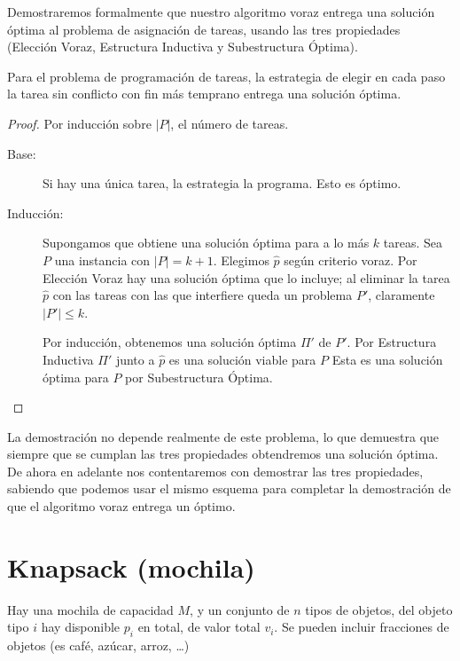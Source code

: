   Demostraremos formalmente que nuestro algoritmo voraz
  entrega una solución óptima al problema de asignación de tareas,
  usando las tres propiedades
  (Elección Voraz,
   Estructura Inductiva
   y Subestructura Óptima).
  \begin{theorem}
    Para el problema de programación de tareas,
    la estrategia de elegir en cada paso la tarea sin conflicto
    con fin más temprano entrega una solución óptima.
  \end{theorem}
  \begin{proof}
    Por inducción sobre \(\lvert P \rvert\),
    el número de tareas.
    \begin{description}
    \item[Base:]
      Si hay una única tarea,
      la estrategia la programa.
      Esto es óptimo.
    \item[Inducción:]
      Supongamos que obtiene una solución óptima para a lo más \(k\) tareas.
      Sea \(P\) una instancia con \(\lvert P \rvert = k + 1\).
      Elegimos \(\widehat{p}\) según criterio voraz.
      Por Elección Voraz hay una solución óptima que lo incluye;
      al eliminar la tarea \(\widehat{p}\)
      con las tareas con las que interfiere
      queda un problema \(P'\),
      claramente \(\lvert P' \rvert \le k\).

      Por inducción,
      obtenemos una solución óptima \(\Pi'\) de \(P'\).
      Por Estructura Inductiva \(\Pi'\) junto a \(\widehat p\)
      es una solución viable para \(P\)
      Esta es una solución óptima para \(P\) por Subestructura Óptima.
    \end{description}
  \end{proof}
  La demostración no depende realmente de este problema,
  lo que demuestra que siempre que se cumplan las tres propiedades
  obtendremos una solución óptima.
  De ahora en adelante nos contentaremos con demostrar las tres propiedades,
  sabiendo que podemos usar el mismo esquema para completar la demostración
  de que el algoritmo voraz entrega un óptimo.

\section{Knapsack (mochila)}
\label{sec:fractional-knapsack}

  Hay una mochila de capacidad \(M\),
  y un conjunto de \(n\) tipos de objetos,
  del objeto tipo \(i\) hay disponible \(p_i\) en total,
  de valor total \(v_i\).
  Se pueden incluir fracciones de objetos
  (es café, azúcar, arroz, \ldots)

